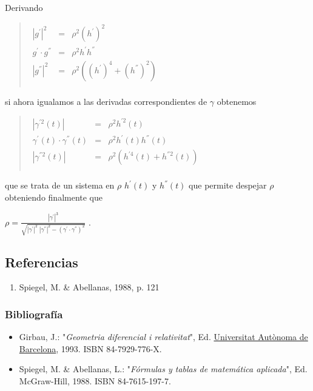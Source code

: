 \documentclass[11pt]{article}
\begin{document}
Derivando

\begin{quote}
\(\begin{matrix}
  {|g^{\prime}|^{2}} & = & {\rho^{2}(h^{\prime})^{2}} \\
  {g^{\prime} \cdot g^{''}} & = & {\rho^{2}h^{\prime}h^{''}} \\
  {|g^{''}|^{2}} & = & {\rho^{2}\left( {(h^{\prime})^{4} + (h^{''})^{2}} \right)} \\
  \end{matrix}\)
\end{quote}

si ahora igualamos a las derivadas correspondientes de
\(\gamma\)
obtenemos

\begin{quote}
\(\begin{matrix}
  {|\gamma^{\prime 2}(t)|} & = & {\rho^{2}h^{\prime 2}(t)} \\
  {\gamma^{\prime}(t) \cdot \gamma^{''}(t)} & = & {\rho^{2}h^{\prime}(t)h^{''}(t)} \\
  {|\gamma^{''2}(t)|} & = & {\rho^{2}(h^{\prime 4}(t) + h^{''2}(t))} \\
  \end{matrix}\)
\end{quote}

que se trata de un sistema en
\(\rho\)
\(h^{\prime}(t)\)
y
\(h^{''}(t)\)
que permite despejar
\(\rho\)
obteniendo finalmente que

\(\rho = \frac{|\gamma^{\prime}|^{3}}{\sqrt{|\gamma^{\prime}|^{2}\;|\gamma^{''}|^{2} - (\gamma^{\prime} \cdot \gamma^{''})^{2}}}\)
.

\subsection{Referencias}
\label{sec:orge976f51}

\begin{enumerate}
\item Spiegel, M. \& Abellanas, 1988, p. 121
\end{enumerate}

\subsubsection{Bibliografía}
\label{sec:org74ba532}

\begin{itemize}
\item Girbau, J.: "\emph{Geometria diferencial i relativitat}", Ed. \href{file:///wiki/Universidad\_Aut\%C3\%B3noma\_de\_Barcelona}{Universitat Autònoma de Barcelona}, 1993.
ISBN 84-7929-776-X.
\item Spiegel, M. \& Abellanas, L.: "\emph{Fórmulas y tablas de matemática aplicada}", Ed. McGraw-Hill, 1988.
ISBN 84-7615-197-7.
\end{itemize}
\end{document}
